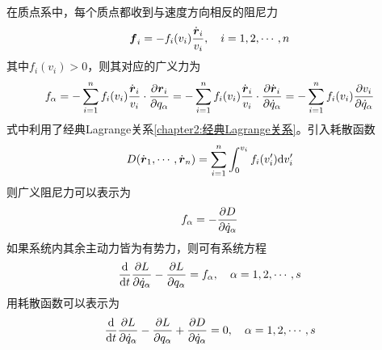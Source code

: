在质点系中，每个质点都收到与速度方向相反的阻尼力
\begin{equation*}
	\boldsymbol{f}_i = -f_i(v_i) \frac{\dot{\boldsymbol{r}}_i}{v_i},\quad i=1,2,\cdots,n
\end{equation*}
其中$f_i(v_i)>0$，则其对应的广义力为
\begin{equation*}
	f_\alpha = -\sum_{i=1}^n f_i(v_i) \frac{\dot{\boldsymbol{r}}_i}{v_i} \cdot \frac{\partial \boldsymbol{r}_i}{\partial q_\alpha} = -\sum_{i=1}^n f_i(v_i) \frac{\dot{\boldsymbol{r}}_i}{v_i} \cdot \frac{\partial \dot{\boldsymbol{r}}_i}{\partial \dot{q}_\alpha} = -\sum_{i=1}^n f_i(v_i) \frac{\partial v_i}{\partial \dot{q}_\alpha}
\end{equation*}
式中利用了经典Lagrange关系\eqref{chapter2:经典Lagrange关系}。引入{\heiti 耗散函数}
\begin{equation}
	D(\dot{\boldsymbol{r}}_1,\cdots,\dot{\boldsymbol{r}}_n) = \sum_{i=1}^n \int_0^{v_i} f_i(v'_i) \mathrm{d} v'_i
\end{equation}
则广义阻尼力可以表示为
\begin{equation*}
	f_\alpha = -\frac{\partial D}{\partial \dot{q}_\alpha}
\end{equation*}
如果系统内其余主动力皆为有势力，则可有系统方程
\begin{equation*}
	\frac{\mathrm{d}}{\mathrm{d} t} \frac{\partial L}{\partial \dot{q}_\alpha} - \frac{\partial L}{\partial q_\alpha} = f_\alpha,\quad \alpha = 1,2,\cdots,s
\end{equation*}
用耗散函数可以表示为
\begin{equation}
	\frac{\mathrm{d}}{\mathrm{d} t} \frac{\partial L}{\partial \dot{q}_\alpha} - \frac{\partial L}{\partial q_\alpha} + \frac{\partial D}{\partial \dot{q}_\alpha} = 0,\quad \alpha=1,2,\cdots,s
	\label{阻尼系统的Lagrange方程}
\end{equation}

